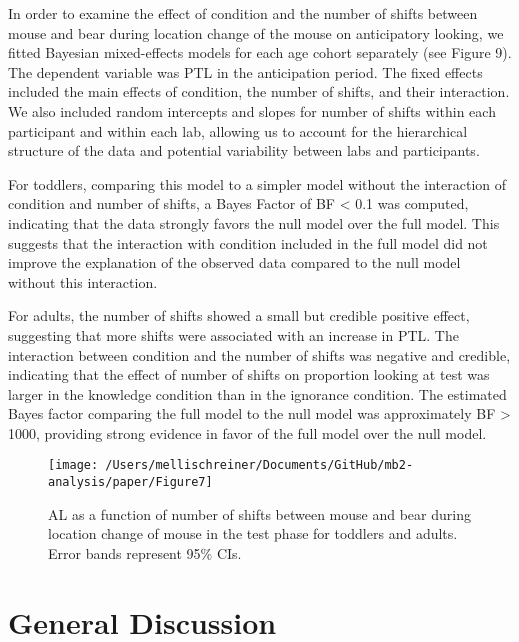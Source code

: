 \documentclass[
  man,floatsintext]{apa6}
\begin{document}
In order to examine the effect of condition and the number of shifts between mouse and bear during location change of the mouse on anticipatory looking, we fitted Bayesian mixed-effects models for each age cohort separately (see Figure 9). The dependent variable was PTL in the anticipation period. The fixed effects included the main effects of condition, the number of shifts, and their interaction. We also included random intercepts and slopes for number of shifts within each participant and within each lab, allowing us to account for the hierarchical structure of the data and potential variability between labs and participants.

For toddlers, comparing this model to a simpler model without the interaction of condition and number of shifts, a Bayes Factor of BF \textless{} 0.1 was computed, indicating that the data strongly favors the null model over the full model. This suggests that the interaction with condition included in the full model did not improve the explanation of the observed data compared to the null model without this interaction.

For adults, the number of shifts showed a small but credible positive effect, suggesting that more shifts were associated with an increase in PTL. The interaction between condition and the number of shifts was negative and credible, indicating that the effect of number of shifts on proportion looking at test was larger in the knowledge condition than in the ignorance condition. The estimated Bayes factor comparing the full model to the null model was approximately BF \textgreater{} 1000, providing strong evidence in favor of the full model over the null model.

\begin{figure}

{\centering \texttt{[image: /Users/mellischreiner/Documents/GitHub/mb2-analysis/paper/Figure7]} 

}

\caption{AL as a function of number of shifts between mouse and bear during location change of mouse in the test phase for toddlers and adults. Error bands represent 95\% CIs.}\label{fig:fig9}
\end{figure}

\section{General Discussion}\label{general-discussion}
\end{document}
